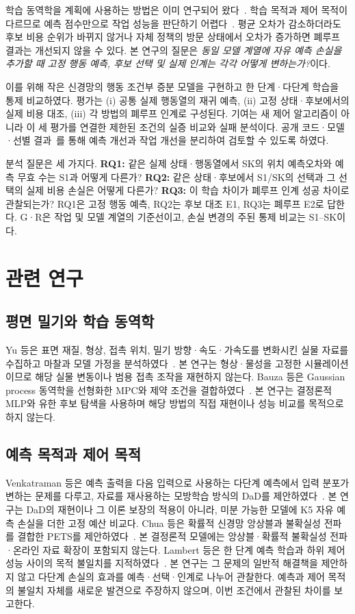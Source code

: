 \documentclass[conference,a4paper]{IEEEtran}
\begin{document}
학습 동역학을 계획에 사용하는 방법은 이미 연구되어 왔다~\cite{bauza2018,chua2018}.
학습 목적과 제어 목적이 다르므로 예측 점수만으로 작업 성능을 판단하기 어렵다~\cite{lambert2020}.
평균 오차가 감소하더라도 후보 비용 순위가 바뀌지 않거나 자체 정책의 방문 상태에서 오차가 증가하면 폐루프 결과는 개선되지 않을 수 있다.
본 연구의 질문은 \emph{동일 모델 계열에 자유 예측 손실을 추가할 때 고정 행동 예측, 후보 선택 및 실제 인계는 각각 어떻게 변하는가?}이다.

이를 위해 작은 신경망의 행동 조건부 증분 모델을 구현하고 한 단계·다단계 학습을 통제 비교하였다.
평가는 (i) 공통 실제 행동열의 재귀 예측, (ii) 고정 상태·후보에서의 실제 비용 대조, (iii) 각 방법의 폐루프 인계로 구성된다.
기여는 새 제어 알고리즘이 아니라 이 세 평가를 연결한 제한된 조건의 실증 비교와 실패 분석이다.
공개 코드·모델·선별 결과~\cite{repository}를 통해 예측 개선과 작업 개선을 분리하여 검토할 수 있도록 하였다.

분석 질문은 세 가지다.
\textbf{RQ1:} 같은 실제 상태·행동열에서 SK의 위치 예측오차와 예측 무효 수는 S1과 어떻게 다른가?
\textbf{RQ2:} 같은 상태·후보에서 S1/SK의 선택과 그 선택의 실제 비용 손실은 어떻게 다른가?
\textbf{RQ3:} 이 학습 차이가 폐루프 인계 성공 차이로 관찰되는가?
RQ1은 고정 행동 예측, RQ2는 후보 대조 E1, RQ3는 폐루프 E2로 답한다.
G·R은 작업 및 모델 계열의 기준선이고, 손실 변경의 주된 통제 비교는 S1--SK이다.

\section{관련 연구}\label{sec:related}
\subsection{평면 밀기와 학습 동역학}
Yu 등은 표면 재질, 형상, 접촉 위치, 밀기 방향·속도·가속도를 변화시킨 실물 자료를 수집하고 마찰과 모델 가정을 분석하였다~\cite{yu2016}.
본 연구는 형상·물성을 고정한 시뮬레이션이므로 해당 실물 변동이나 범용 접촉 조작을 재현하지 않는다.
Bauza 등은 Gaussian process 동역학을 선형화한 MPC와 제약 조건을 결합하였다~\cite{bauza2018}.
본 연구는 결정론적 MLP와 유한 후보 탐색을 사용하며 해당 방법의 직접 재현이나 성능 비교를 목적으로 하지 않는다.

\subsection{예측 목적과 제어 목적}
Venkatraman 등은 예측 출력을 다음 입력으로 사용하는 다단계 예측에서 입력 분포가 변하는 문제를 다루고,
자료를 재사용하는 모방학습 방식의 DaD를 제안하였다~\cite{venkatraman2015}.
본 연구는 DaD의 재현이나 그 이론 보장의 적용이 아니라, 미분 가능한 모델에 K5 자유 예측 손실을 더한 고정 예산 비교다.
Chua 등은 확률적 신경망 앙상블과 불확실성 전파를 결합한 PETS를 제안하였다~\cite{chua2018}.
본 결정론적 모델에는 앙상블·확률적 불확실성 전파·온라인 자료 확장이 포함되지 않는다.
Lambert 등은 한 단계 예측 학습과 하위 제어 성능 사이의 목적 불일치를 지적하였다~\cite{lambert2020}.
본 연구는 그 문제의 일반적 해결책을 제안하지 않고 다단계 손실의 효과를 예측·선택·인계로 나누어 관찰한다.
예측과 제어 목적의 불일치 자체를 새로운 발견으로 주장하지 않으며, 이번 조건에서 관찰된 차이를 보고한다.
\end{document}
